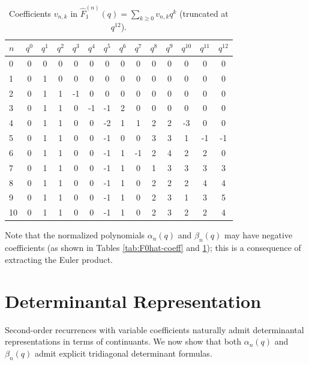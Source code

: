 \documentclass[letterpaper,12pt]{article}
\begin{document}
\begin{table}[H]

\begin{tabular*}{\linewidth}{@{\extracolsep{\fill}}l|ccccccccccccc}
\toprule
$n$ & $q^0$ & $q^1$ & $q^2$ & $q^3$ & $q^4$ & $q^5$ & $q^6$ & $q^7$ & $q^8$ & $q^9$ & $q^{10}$ & $q^{11}$ & $q^{12}$ \\
\midrule
0  & 0 & 0 & 0 & 0 & 0 & 0 & 0 & 0 & 0 & 0 & 0 & 0 & 0 \\
1  & 0 & 1 & 0 & 0 & 0 & 0 & 0 & 0 & 0 & 0 & 0 & 0 & 0 \\
2  & 0 & 1 & 1 & -1 & 0 & 0 & 0 & 0 & 0 & 0 & 0 & 0 & 0 \\
3  & 0 & 1 & 1 & 0 & -1 & -1 & 2 & 0 & 0 & 0 & 0 & 0 & 0 \\
4  & 0 & 1 & 1 & 0 & 0 & -2 & 1 & 1 & 2 & 2 & -3 & 0 & 0 \\
5  & 0 & 1 & 1 & 0 & 0 & -1 & 0 & 0 & 3 & 3 & 1 & -1 & -1 \\
6  & 0 & 1 & 1 & 0 & 0 & -1 & 1 & -1 & 2 & 4 & 2 & 2 & 0 \\
7  & 0 & 1 & 1 & 0 & 0 & -1 & 1 & 0 & 1 & 3 & 3 & 3 & 3 \\
8  & 0 & 1 & 1 & 0 & 0 & -1 & 1 & 0 & 2 & 2 & 2 & 4 & 4 \\
9  & 0 & 1 & 1 & 0 & 0 & -1 & 1 & 0 & 2 & 3 & 1 & 3 & 5 \\
10 & 0 & 1 & 1 & 0 & 0 & -1 & 1 & 0 & 2 & 3 & 2 & 2 & 4 \\
\bottomrule
\end{tabular*}
\caption{Coefficients $v_{n,k}$ in $\widehat F^{(n)}_1(q)=\sum_{k\ge0} v_{n,k}q^k$ (truncated at $q^{12}$).}\label{tab:F1hat-coeff}
\end{table}

Note that the normalized polynomials  $\alpha_n(q)$ and  $\beta_n(q)$ may have negative coefficients (as shown in Tables \ref{tab:F0hat-coeff} and \ref{tab:F1hat-coeff}); this is a consequence of extracting the Euler product.



\section{Determinantal  Representation}\label{sec:Determinantel}
Second-order recurrences with variable coefficients naturally admit determinantal representations in terms of continuants. 
We now show that both $\alpha_n(q)$ and $\beta_n(q)$ admit explicit tridiagonal determinant formulas.
\end{document}

